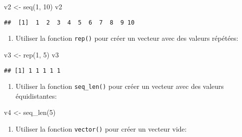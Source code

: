 \documentclass[
]{article}
\newenvironment{Shaded}{\begin{snugshade}}{\end{snugshade}}
\newcommand{\DecValTok}[1]{\textcolor[rgb]{0.00,0.00,0.81}{#1}}
\newcommand{\FunctionTok}[1]{\textcolor[rgb]{0.00,0.00,0.00}{#1}}
\newcommand{\NormalTok}[1]{#1}
\newcommand{\OtherTok}[1]{\textcolor[rgb]{0.56,0.35,0.01}{#1}}
\providecommand{\tightlist}{%
  \setlength{\itemsep}{0pt}\setlength{\parskip}{0pt}}
\begin{document}
\begin{Shaded}
\begin{Highlighting}[]
\NormalTok{v2 }\OtherTok{\textless{}{-}} \FunctionTok{seq}\NormalTok{(}\DecValTok{1}\NormalTok{, }\DecValTok{10}\NormalTok{)}
\NormalTok{v2}
\end{Highlighting}
\end{Shaded}

\begin{verbatim}
##  [1]  1  2  3  4  5  6  7  8  9 10
\end{verbatim}

\begin{enumerate}
\def\labelenumi{\arabic{enumi}.}
\setcounter{enumi}{2}
\tightlist
\item
  Utiliser la fonction \texttt{rep()} pour créer un vecteur avec des valeurs répétées:
\end{enumerate}

\begin{Shaded}
\begin{Highlighting}[]
\NormalTok{v3 }\OtherTok{\textless{}{-}} \FunctionTok{rep}\NormalTok{(}\DecValTok{1}\NormalTok{, }\DecValTok{5}\NormalTok{)}
\NormalTok{v3}
\end{Highlighting}
\end{Shaded}

\begin{verbatim}
## [1] 1 1 1 1 1
\end{verbatim}

\begin{enumerate}
\def\labelenumi{\arabic{enumi}.}
\setcounter{enumi}{3}
\tightlist
\item
  Utiliser la fonction \texttt{seq\_len()} pour créer un vecteur avec des valeurs équidistantes:
\end{enumerate}

\begin{Shaded}
\begin{Highlighting}[]
\NormalTok{v4 }\OtherTok{\textless{}{-}} \FunctionTok{seq\_len}\NormalTok{(}\DecValTok{5}\NormalTok{)}
\end{Highlighting}
\end{Shaded}

\begin{enumerate}
\def\labelenumi{\arabic{enumi}.}
\setcounter{enumi}{4}
\tightlist
\item
  Utiliser la fonction \texttt{vector()} pour créer un vecteur vide:
\end{enumerate}
\end{document}
